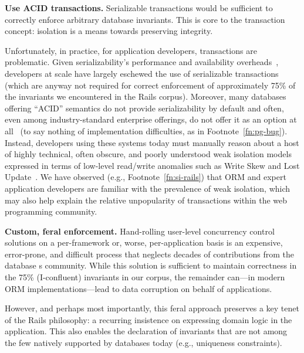 \begin{impenumerate}
\item \textbf{Use ACID transactions.} Serializable transactions would
  be sufficient to correctly enforce arbitrary database
  invariants. This is core to the transaction concept: isolation is a
  means towards preserving integrity. \vspace{.5em}

  Unfortunately, in practice, for application developers, transactions
  are problematic. Given serializability's performance and
  availability overheads~\cite{brewer-cap}, developers at scale have
  largely eschewed the use of serializable transactions (which are
  anyway not required for correct enforcement of approximately 75\% of
  the invariants we encountered in the Rails corpus). Moreover, many
  databases offering ``ACID'' semantics do not provide serializability
  by default and often, even among industry-standard enterprise
  offerings, do not offer it as an option at all~\cite{hat-vldb} (to
  say nothing of implementation difficulties, as in
  Footnote~\ref{fn:pg-bug}). Instead, developers using these systems
  today must manually reason about a host of highly technical, often
  obscure, and poorly understood weak isolation models expressed in
  terms of low-level read/write anomalies such as Write Skew and Lost
  Update~\cite{adya-isolation,consistency-borders}. We have observed
  (e.g., Footnote~\ref{fn:si-rails}) that ORM and expert application
  developers are familiar with the prevalence of weak isolation, which
  may also help explain the relative unpopularity of transactions
  within the web programming community.

\item\textbf{Custom, feral enforcement.} Hand-rolling
  user-level concurrency control solutions on a per-framework or,
  worse, per-application basis is an expensive, error-prone, and
  difficult process that neglects decades of contributions from the
  database s community. While this solution is sufficient to maintain
  correctness in the 75\% (I-confluent) invariants in our corpus, the
  remainder can---in modern ORM implementations---lead to data
  corruption on behalf of applications. \vspace{.5em}

  However, and perhaps most importantly, this feral approach preserves
  a key tenet of the Rails philosophy: a recurring insistence on
  expressing domain logic in the application. This also enables the
  declaration of invariants that are not among the few natively
  supported by databases today (e.g., uniqueness constraints).
\end{impenumerate}

